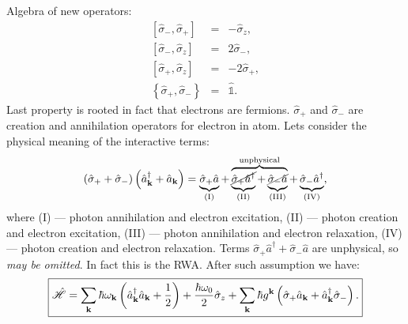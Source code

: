 Algebra of new operators:
\begin{eqnarray}
	\left[ \hat{\sigma}_-, \hat{\sigma}_+ \right] &=& - \hat{\sigma}_z, \\
	\left[ \hat{\sigma}_-, \hat{\sigma}_z \right] &=& 2\hat{\sigma}_-, \\
	\left[ \hat{\sigma}_+, \hat{\sigma}_z \right] &=& -2 \hat{\sigma}_+, \\
	\left\{ \hat{\sigma}_+, \hat{\sigma}_- \right\} &=& \hat{\mathbb{1}}.
\end{eqnarray}
Last property is rooted in fact that electrons are fermions. $\hat{\sigma}_+$ and $\hat{\sigma}_-$ are creation and annihilation operators for electron in atom. Lets consider the physical meaning of the interactive terms:
\begin{equation}
	\left( \hat{\sigma}_+ + \hat{\sigma}_- \right) \left( \hat{a}^{\dagger}_{\mathbf{k}} + \hat{a}_{\mathbf{k}} \right) = \underbrace{\hat{\sigma}_+ \hat{a}}_{\text{(I)}} + \overbrace{\underbrace{\cancel{\hat{\sigma}_+ \hat{a}^{\dagger}}}_{\text{(II)}} + \underbrace{\cancel{\hat{\sigma}_- \hat{a}}}_{\text{(III)}}}^{\text{unphysical}} + \underbrace{\hat{\sigma}_- \hat{a}^{\dagger}}_{\text{(IV)}},
\end{equation}
where (I) --- photon annihilation and electron excitation, (II) --- photon creation and electron excitation, (III) --- photon annihilation and electron relaxation, (IV) --- photon creation and electron relaxation. Terms  $\hat{\sigma}_+\hat{a}^{\dagger} + \hat{\sigma}_-\hat{a}$ are unphysical, so \textit{may be omitted}. In fact this is the RWA. After such assumption we have:
\begin{equation}
	\boxed{\hat{\mathscr{H}} = \sum_{\mathbf{k}} \hbar \omega_{\mathbf{k}} \left( \hat{a}_{\mathbf{k}}^{\dagger}\hat{a}_{\mathbf{k}} + \frac{1}{2} \right) + \frac{\hbar \omega_0}{2} \hat{\sigma}_z + \sum_{\mathbf{k}} \hbar g^{\mathbf{k}} \left( \hat{\sigma}_+\hat{a}_{\mathbf{k}} + \hat{a}^{\dagger}_{\mathbf{k}} \hat{\sigma}_- \right).}
\end{equation}

